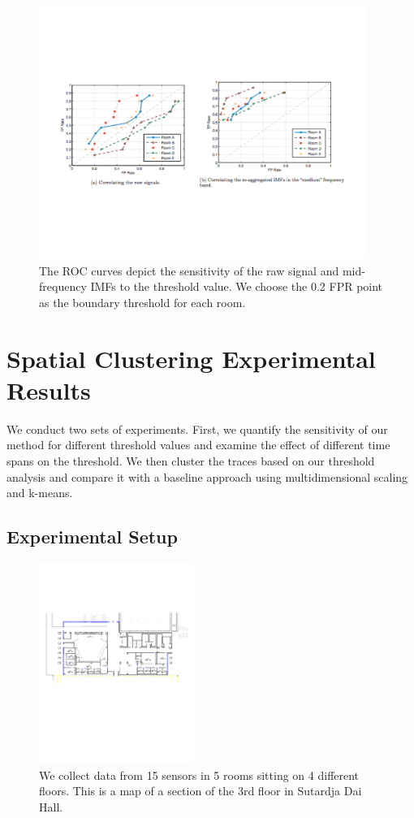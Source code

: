\begin{figure}[ht!]
\centering
	 \includegraphics[width=0.95\textwidth]{figs/ROCgraphs}
\caption{The ROC curves depict the sensitivity of the raw signal and mid-frequency IMFs to the threshold value. We choose the 0.2 FPR point as the boundary threshold for each room. }
\label{fig:roc}
\end{figure}

\section{Spatial Clustering Experimental Results}
We conduct two sets of experiments. First, we quantify the sensitivity of our method for different threshold values 
and examine the effect of different time spans on the threshold. We then cluster the traces based on our threshold analysis 
and compare it with a baseline approach using multidimensional scaling and k-means.

\subsection{Experimental Setup}
\begin{figure}[h!]
\centering
  \includegraphics[width=0.45\textwidth]{figs/SDH3_crop}
\caption{We collect data from 15 sensors in 5 rooms sitting on 4 different floors. This is a map of a section of the 3rd floor
in Sutardja Dai Hall.}
\label{fig:sdh}
\end{figure}

